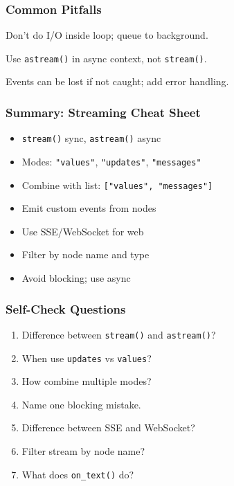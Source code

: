 \documentclass[aspectratio=169,11pt]{beamer}
\begin{document}
\begin{frame}
\frametitle{Common Pitfalls}
\begin{warningbox}
Don't do I/O inside loop; queue to background.
\end{warningbox}
\vspace{0.1cm}
\begin{warningbox}
Use \texttt{astream()} in async context, not \texttt{stream()}.
\end{warningbox}
\vspace{0.1cm}
\begin{warningbox}
Events can be lost if not caught; add error handling.
\end{warningbox}
\end{frame}

\begin{frame}
\frametitle{Summary: Streaming Cheat Sheet}
\begin{conceptbox}
\setlength{\itemsep}{1pt}
\begin{itemize}
\item \texttt{stream()} sync, \texttt{astream()} async
\item Modes: \texttt{"values"}, \texttt{"updates"}, \texttt{"messages"}
\item Combine with list: \texttt{["values", "messages"]}
\item Emit custom events from nodes
\item Use SSE/WebSocket for web
\item Filter by node name and type
\item Avoid blocking; use async
\end{itemize}
\end{conceptbox}
\end{frame}

\begin{frame}
\frametitle{Self-Check Questions}
\begin{enumerate}
\setlength{\itemsep}{2pt}
\item Difference between \texttt{stream()} and \texttt{astream()}?
\item When use \texttt{updates} vs \texttt{values}?
\item How combine multiple modes?
\item Name one blocking mistake.
\item Difference between SSE and WebSocket?
\item Filter stream by node name?
\item What does \texttt{on\_text()} do?
\end{enumerate}
\end{frame}
\end{document}
